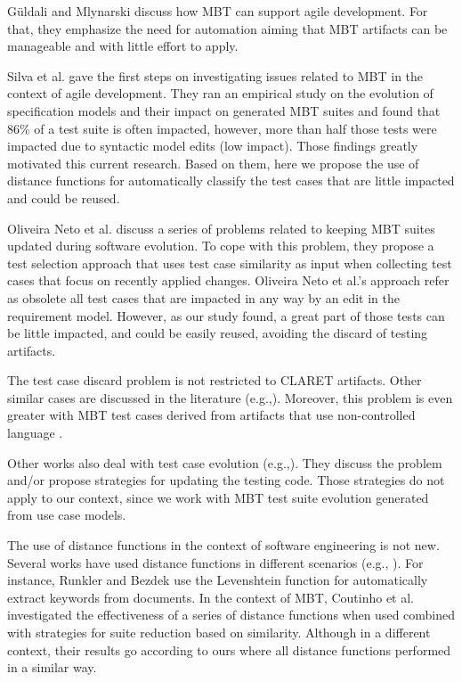 Güldali and Mlynarski \cite{katara2006making} discuss how MBT can support agile development. For that, they emphasize the need for automation aiming that MBT artifacts can be manageable and with little effort to apply. 

Silva et al. \cite{Silva:2018:SIM:3266003.3266009} gave the first steps on investigating issues related to MBT in the context of agile development. They ran an empirical study on the evolution of specification models and their impact on generated MBT suites and found that 86\% of a test suite is often impacted, however, more than half those tests were impacted due to syntactic model edits (low impact). Those findings greatly motivated this current research. Based on them, here we propose the use of distance functions for automatically classify the test cases that are little impacted and could be reused.

Oliveira Neto et al. \cite{de2016full} discuss a series of problems related to keeping MBT suites updated during software evolution. To cope with this problem, they propose a test selection approach that uses test case similarity as input when collecting test cases that focus on recently applied changes. Oliveira Neto et al.'s approach refer as obsolete all test cases that are impacted in any way by an edit in the requirement model. However, as our study found, a great part of those tests can be little impacted, and could be easily reused, avoiding the discard of testing artifacts. 

The test case discard problem is not restricted to CLARET artifacts. Other similar cases are discussed in the literature (e.g.,\cite{de2016full,nogueira2007model}). Moreover, this problem is even greater with MBT test cases derived from artifacts that use non-controlled language \cite{pinto2012understanding}.

Other works also deal with test case evolution (e.g.,\cite{mirzaaghaei2011automatic,pinto2012understanding}). They discuss the problem and/or propose strategies for updating the testing code. Those strategies do not apply to our context, since we work with MBT test suite evolution generated from use case models. 


The use of distance functions in the context of software engineering is not new. Several works have used distance functions in different scenarios (e.g., \cite{runkler2000automatic,okuda1976method,lubis2018combination}). For instance, Runkler and Bezdek \cite{runkler2000automatic} use the Levenshtein function for automatically extract keywords from documents. In the context of MBT, Coutinho et al. \cite{coutinho2016analysis} investigated the effectiveness of a series of distance functions when used combined with strategies for suite reduction based on similarity. Although in a different context, their results go according to ours where all distance functions performed in a similar way.





